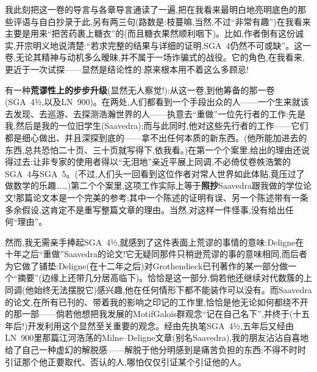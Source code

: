 我此刻把这一卷的导言与各章导言通读了一遍,把在我看来最明白地亮明底色的那些评语与自白抄录于此,另有两三句(路数是:枝蔓嘛,当然,不过“非常有趣”)在我看来主要是用来“把苦药裹上糖衣”的(而且糖衣果然顺利咽下)。比如,作者倒有这份诚实,开宗明义地说清楚:“若求完整的结果与详细的证明,SGA~4仍然不可或缺”。这一卷,无论其精神与动机多么暧昧,并不属于一场诈骗式的战役。它的角色,在我看来,更近于一次试探——显然是结论性的:原来根本用不着这么多顾忌!

\dmark{}有一种\textbf{荒谬性上的步步升级}(显然无人察觉!):从这一卷,到他筹备的那一卷(SGA~4½,以及LN~900)。在两处,人们都看到一个手段出众的人——一个生来就该去发现、去巡游、去探测浩瀚世界的人——执意去“重做”一位先行者的工作:先是我,然后是我的一位旧学生(Saavedra);而与此同时,他对这些先行者的工作——它们都是细心做出、并且深探到底的——拿不出任何本质的新东西。(他所能加进去的东西,总共恐怕二十页、三十页就写得下,依我看。)在第一个个案里,给出的理由还说得过去:让非专家的使用者得以“无泪地”亲近平展上同调,不必倚仗卷帙浩繁的SGA~4与SGA~5。(不过,人们头一回看到这位作者对常人世界如此体贴,竟压过了做数学的乐趣……)第二个个案里,这项工作实际上等于\textbf{照抄}Saavedra跟我做的学位论文!那篇论文本是一个完美的参考;其中一个陈述的证明有误、另一个陈述带有一条多余假设,这肯定不是重写整篇文章的理由。当然,对这样一件怪事,没有给出任何“理由”。

然而,我无需亲手捧起SGA~4½,就感到了这件表面上荒谬的事情的意味:Deligne在十年之后“重做”Saavedra的论文!它无疑同那件只稍逊荒谬的事的意味相同,而后者为它做了铺垫:Deligne(在十二年之后)对Grothendieck已刊著作的某一部分做一个“摘要”(边缘上还带几分居高临下)。恰恰是这一部分,倘若他还继续对代数簇的上同调(他始终无法摆脱它)感兴趣,他在任何情形下都不能装作可以没有。而Saavedra的论文,在所有已刊的、带着我的影响之印记的工作里,恰恰是他无论如何都绕不开的那一部——倘若他想把我发展的\dmark{}MotifGalois群观念“记在自己名下”,并终于(十五年后!)开发利用这个显然至关重要的观念。经由先执笔SGA~4½,五年后又经由LN~900里那篇江河浩荡的Milne--Deligne文章(别名Saavedra),我的朋友沾沾自喜地给了自己一种虚幻的解脱感——解脱于他分明感到是痛苦负担的东西:不得不时时引证那个他正要取代、否认的人,哪怕仅仅引证某个引证他的人。

